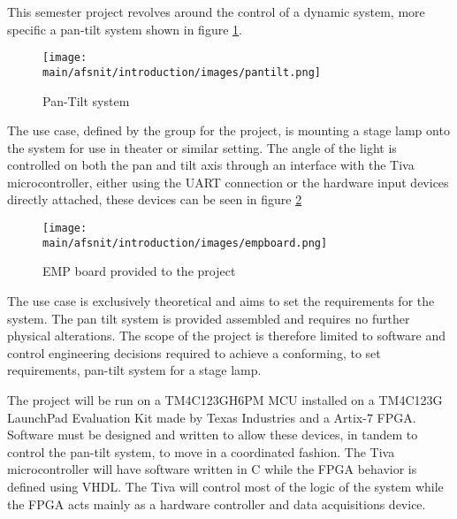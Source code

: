 \documentclass[../../main]{subfiles}
\begin{document}
This semester project revolves around the control of a dynamic system, more specific a pan-tilt  system shown in figure \ref{fig:system}.

\begin{figure}[H]
\centering
\texttt{[image: \\main/afsnit/introduction/images/pantilt.png]}
\caption{Pan-Tilt system}
\label{fig:system}
\end{figure}

The use case, defined by the group for the project, is mounting a stage lamp onto the system for use in theater or similar setting.
The angle of the light is controlled on both the pan and tilt axis through an interface with the Tiva microcontroller, either using the UART connection or the hardware input devices directly attached, these devices can be seen in figure \ref{fig:empboard}

\begin{figure}[H]
\texttt{[image: \\main/afsnit/introduction/images/empboard.png]}
\caption{EMP board provided to the project}
\label{fig:empboard}
\end{figure}

The use case is exclusively theoretical and aims to set the requirements for the system.
The pan tilt system is provided assembled and requires no further physical alterations. The scope of the project is therefore limited to software and control engineering decisions required to achieve a conforming, to set requirements, pan-tilt system for a stage lamp.

The project will be run on a  TM4C123GH6PM MCU installed on a TM4C123G LaunchPad Evaluation Kit made by Texas Industries and a Artix-7 FPGA. Software must be designed and written to allow these devices, in tandem to control the pan-tilt system, to move in a coordinated fashion.
The Tiva microcontroller will have software written in C while the FPGA behavior is defined using VHDL. The Tiva will control most of the logic of the system while the FPGA acts mainly as a hardware controller and data acquisitions device.
\end{document}
